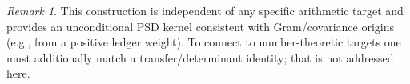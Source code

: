 \documentclass[11pt]{article}
\theoremstyle{plain}
\theoremstyle{remark}
\newtheorem{remark}[theorem]{Remark}
\begin{document}
\begin{remark}
This construction is independent of any specific arithmetic target and provides an unconditional PSD kernel consistent with Gram/covariance origins (e.g., from a positive ledger weight). To connect to number-theoretic targets one must additionally match a transfer/determinant identity; that is not addressed here.
\end{remark}
\end{document}
